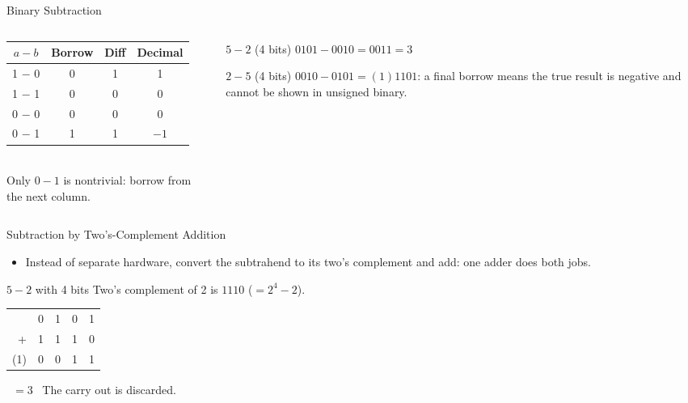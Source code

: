 \documentclass[9pt,aspectratio=169,xcolor=table]{beamer}
\newcommand{\striped}{\rowcolors{1}{white}{stripe}}
\begin{document}
\begin{frame}{Binary Subtraction}
  \begin{columns}[t]
  \begin{column}{.5\textwidth}
    \centering\small\striped
    \begin{tabular}{@{}cccc@{}}
      \toprule
      $a - b$ & Borrow & Diff & Decimal \\
      \midrule
      1 $-$ 0 & 0 & 1 & 1 \\ 1 $-$ 1 & 0 & 0 & 0 \\ 0 $-$ 0 & 0 & 0 & 0 \\ 0 $-$ 1 & 1 & 1 & $-1$ \\
      \bottomrule
    \end{tabular}\\[2mm]
    \small Only $0 - 1$ is nontrivial: borrow from the next column.
  \end{column}
  \begin{column}{.48\textwidth}
    \begin{block}{$5 - 2$ (4 bits)}
      \small $0101 - 0010 = 0011 = 3$ \checkmark
    \end{block}
    \begin{block}{$2 - 5$ (4 bits)}
      \small $0010 - 0101 = (1)1101$: a final borrow means the true result is negative and cannot be shown in unsigned binary.
    \end{block}
  \end{column}
  \end{columns}
\end{frame}

\begin{frame}{Subtraction by Two's-Complement Addition}
  \begin{itemize}\small\itemsep4pt
    \item Instead of separate hardware, convert the subtrahend to its two's complement and add: one adder does both jobs.
  \end{itemize}
  \begin{block}{$5 - 2$ with 4 bits}
    \small Two's complement of 2 is $1110$ ($= 2^4 - 2$).\\
    \begin{tabular}{r llll}
      & 0 & 1 & 0 & 1 \\
      + & 1 & 1 & 1 & 0 \\
      \hline
      (1) & 0 & 0 & 1 & 1 \\
    \end{tabular}\ $= 3$ \checkmark\ The carry out is discarded.
  \end{block}
\end{frame}
\end{document}
